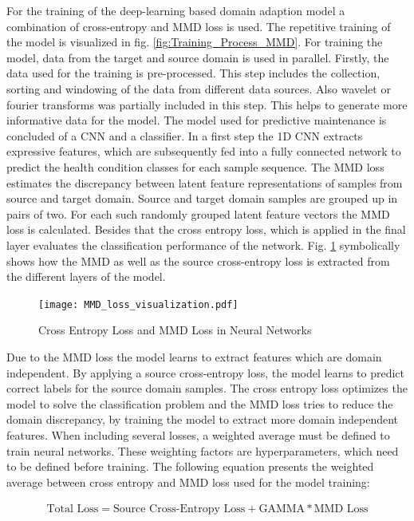 For the training of the deep-learning based domain adaption model a combination of cross-entropy and MMD loss is used. The repetitive training of the model is visualized in fig. \ref{fig:Training_Process_MMD}. For training the model, data from the target and source domain is used in parallel. Firstly, the data used for the training is pre-processed. This step includes the collection, sorting and windowing of the data from different data sources. Also wavelet or fourier transforms was partially included in this step. This helps to generate more informative data for the model. The model used for predictive maintenance is concluded of a CNN and a classifier. In a first step the 1D CNN extracts expressive features, which are subsequently fed into a fully connected network to predict the health condition classes for each sample sequence. The MMD loss estimates the discrepancy between latent feature representations of samples from source and target domain. Source and target domain samples are grouped up in pairs of two. For each such randomly grouped latent feature vectors the MMD loss is calculated. Besides that the cross entropy loss, which is applied in the final layer evaluates the classification performance of the network. Fig. \ref{fig:MMD_Loss_and_CE_loss} symbolically shows how the MMD as well as the source cross-entropy loss is extracted from the different layers of the model.

\begin{figure}[htpb]
  \centering
  \texttt{[image: MMD\_loss\_visualization.pdf]}
  \caption {Cross Entropy Loss and MMD Loss in Neural Networks} \label{fig:MMD_Loss_and_CE_loss}
\end{figure}
 
Due to the MMD loss the model learns to extract features which are domain independent. By applying a source cross-entropy loss, the model learns to predict correct labels for the source domain samples. The cross entropy loss optimizes the model to solve the classification problem and the MMD loss tries to reduce the domain discrepancy, by training the model to extract more domain independent features. When including several losses, a weighted average must be defined to train neural networks. These weighting factors are hyperparameters, which need to be defined before training. The following equation presents the weighted average between cross entropy and MMD loss used for the model training:

\begin{align}
    \mbox{Total Loss} = \mbox{Source Cross-Entropy Loss} + \mbox{GAMMA} * \mbox{MMD Loss}
\end{align}

